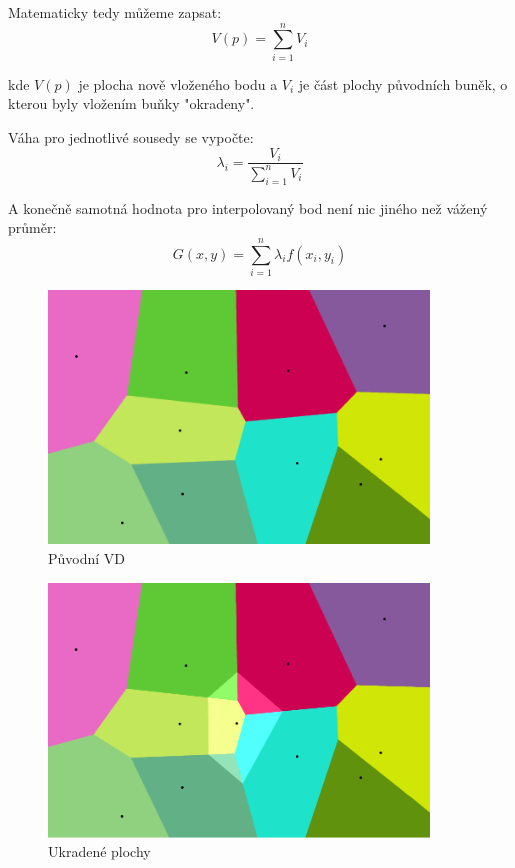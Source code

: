 \documentclass[12pt,a4paper]{article}
\begin{document}
\bigskip
Matematicky tedy můžeme zapsat:
\newline
$$V(p)=\sum_{i=1}^n V_i$$

kde $V(p)$ je plocha nově vloženého bodu a $V_i$ je část plochy původních buněk, o kterou byly vložením buňky "okradeny".

\bigskip
Váha pro jednotlivé sousedy se vypočte:
\newline
$$\lambda_i = \frac{V_i}{\sum_{i=1}^n V_i}$$

\bigskip
A konečně samotná hodnota pro interpolovaný bod není nic jiného než vážený průměr:
\newline
$$G(x,y) = \sum_{i=1}^{n} \lambda_i  f(x_i, y_i)$$

\newpage
\begin{figure}[h!]
\centering
\includegraphics[width=0.9\textwidth]{img/canvas_0.png}
\caption{Původní VD}
\label{fig:fig:canvas0}
\end{figure}

\begin{figure}[h!]
\centering
\includegraphics[width=0.9\textwidth]{img/canvas_1.png}
\caption{Ukradené plochy}
\label{fig:fig:canvas1}
\end{figure}
\end{document}
